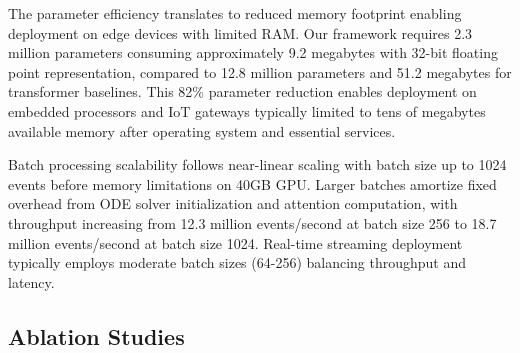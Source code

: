 \documentclass[10pt,journal,compsoc]{IEEEtran}
\begin{document}
The parameter efficiency translates to reduced memory footprint enabling deployment on edge devices with limited RAM. Our framework requires 2.3 million parameters consuming approximately 9.2 megabytes with 32-bit floating point representation, compared to 12.8 million parameters and 51.2 megabytes for transformer baselines. This 82\% parameter reduction enables deployment on embedded processors and IoT gateways typically limited to tens of megabytes available memory after operating system and essential services.

Batch processing scalability follows near-linear scaling with batch size up to 1024 events before memory limitations on 40GB GPU. Larger batches amortize fixed overhead from ODE solver initialization and attention computation, with throughput increasing from 12.3 million events/second at batch size 256 to 18.7 million events/second at batch size 1024. Real-time streaming deployment typically employs moderate batch sizes (64-256) balancing throughput and latency.

\subsection{Ablation Studies}
\end{document}
